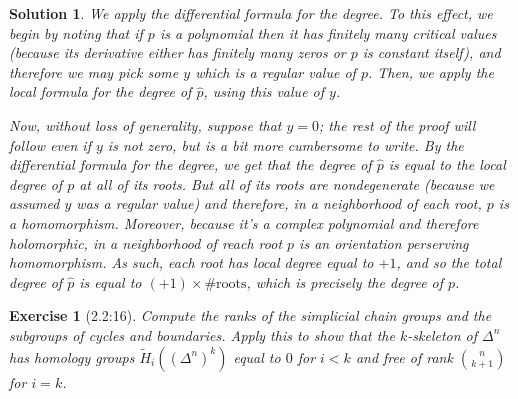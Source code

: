 \documentclass{article}
\theoremstyle{plain}
\newtheorem*{ex}{Exercise}
\theoremstyle{nonumberplain}
\newtheorem{sol}{Solution}
\begin{document}
\begin{sol}
We apply the differential formula for the degree. To this effect, we begin by noting that if $p$ is a polynomial then it has finitely many critical values (because its derivative either has finitely many zeros or $p$ is constant itself), and therefore we may pick some $y$ which is a regular value of $p$. Then, we apply the local formula for the degree of $\hat p$, using this value of $y$.

Now, without loss of generality, suppose that $y = 0$; the rest of the proof will follow even if $y$ is not zero, but is a bit more cumbersome to write. By the differential formula for the degree, we get that the degree of $\hat p$ is equal to the local degree of $p$ at all of its roots. But all of its roots are nondegenerate (because we assumed $y$ was a regular value) and therefore, in a neighborhood of each root, $p$ is a homomorphism. Moreover, because it's a complex polynomial and therefore holomorphic, in a neighborhood of reach root $p$ is an \emph{orientation perserving} homomorphism. As such, each root has local degree equal to $+1$, and so the total degree of $\hat p$ is equal to $(+1) \times \text{\#roots}$, which is precisely the degree of $p$.
\end{sol}

\begin{ex}[2.2:16]
Compute the ranks of the simplicial chain groups and the subgroups of cycles and boundaries. Apply this to show that the $k$-skeleton of $\Delta^n$ has homology groups $\tilde H_i((\Delta^n)^k)$ equal to  $0$ for $i<k$ and free of rank $\binom n {k+1}$ for $i = k$.
\end{ex}
\end{document}
